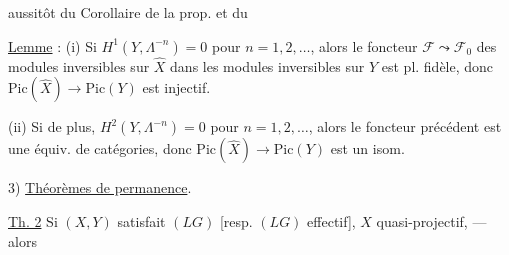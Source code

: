   aussitôt du   Corollaire de la prop. et du

\uline{Lemme} :  (i) Si $H^1(Y,\Lambda^{-n})=0$ pour $n=1,2,\ldots$, alors  le foncteur $\mathcal F\leadsto \mathcal F_0$ des modules  inversibles sur $\hat X$ dans les modules inversibles sur $Y$ est pl. fidèle,  donc $\mathrm{Pic}(\hat X)\longrightarrow\mathrm{Pic}(Y)$ est injectif.

(ii) Si de plus, $H^2(Y,\Lambda^{-n})=0$ pour $n=1,2,\ldots$, alors le foncteur précédent est une équiv. de catégories, donc $\mathrm{Pic}(\hat X)\longrightarrow\mathrm{Pic}(Y)$ est un isom.

3) \uline{Théorèmes de permanence}.



\uline{Th. 2} Si $(X,Y)$ satisfait $(LG)$ [resp. $(LG)$ effectif],  $X$ quasi-projectif, --- alors
